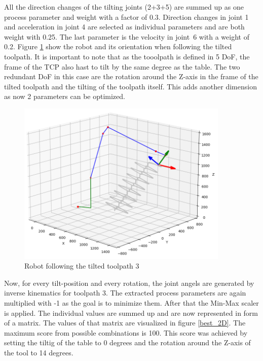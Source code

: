 All the direction changes of the tilting joints (2+3+5) are summed up as one process parameter and weight with a factor of 0.3. Direction changes in joint 1 and acceleration in joint 4 are selected as individual parameters and are both weight with 0.25. The last parameter is the velocity in joint~6 with a weight of 0.2.  
\newpage
Figure \ref{TP3_25_robot} show the robot and its orientation when following the tilted toolpath. It is important to note that as the tooolpath is defined in 5 DoF, the frame of the TCP also hast to tilt by the same degree as the table. The two redundant DoF in this case are the rotation around the Z-axis in the frame of the tilted toolpath and the tilting of the toolpath itself. This adds another dimension as now 2 parameters can be optimized.


\begin{figure}[H]
	\centerline{\includegraphics[width=0.9\textwidth]{figures/robotANDpath3_45.png}}
	\caption{Robot following the tilted toolpath 3}
	\label{TP3_25_robot}
\end{figure}

Now, for every tilt-position and every rotation, the joint angels are generated by inverse kinematics for toolpath 3. The extracted process parameters are again multiplied with -1 as the goal is to minimize them. After that the Min-Max scaler is applied. The individual values are summed up and are now represented in form of a matrix. The values of that matrix are visualized in figure \ref{best_2D}. The maximum score from possible combinations is 100. This score was achieved by setting the tiltig of the table to 0 degrees and the rotation around the Z-axis of the tool to 14 degrees.



